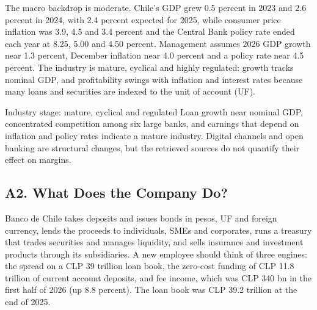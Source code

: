 \documentclass[10pt,a4paper]{article}
\begin{document}
The macro backdrop is moderate. Chile's GDP grew 0.5 percent in 2023 and 2.6 percent in 2024, with 2.4 percent expected for 2025, while consumer price inflation was 3.9, 4.5 and 3.4 percent and the Central Bank policy rate ended each year at 8.25, 5.00 and 4.50 percent. Management assumes 2026 GDP growth near 1.3 percent, December inflation near 4.0 percent and a policy rate near 4.5 percent. The industry is mature, cyclical and highly regulated: growth tracks nominal GDP, and profitability swings with inflation and interest rates because many loans and securities are indexed to the unit of account (UF).
\begin{ocadcallout}{Industry stage: mature, cyclical and regulated}
Loan growth near nominal GDP, concentrated competition among six large banks, and earnings that depend on inflation and policy rates indicate a mature industry. Digital channels and open banking are structural changes, but the retrieved sources do not quantify their effect on margins.
\end{ocadcallout}

\subsection{A2. What Does the Company Do?}
Banco de Chile takes deposits and issues bonds in pesos, UF and foreign currency, lends the proceeds to individuals, SMEs and corporates, runs a treasury that trades securities and manages liquidity, and sells insurance and investment products through its subsidiaries. A new employee should think of three engines: the spread on a CLP 39 trillion loan book, the zero-cost funding of CLP 11.8 trillion of current account deposits, and fee income, which was CLP 340 bn in the first half of 2026 (up 8.8 percent). The loan book was CLP 39.2 trillion at the end of 2025.
\end{document}
